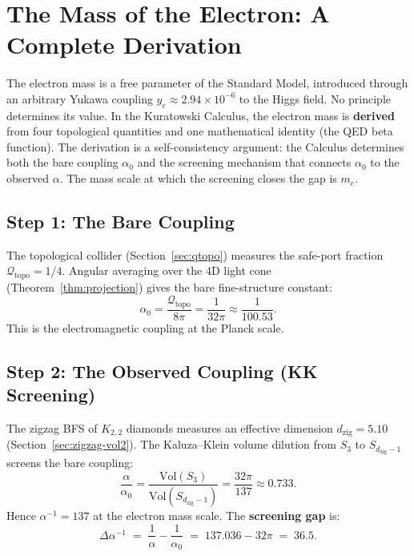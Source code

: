 \documentclass[11pt, a4paper, openany]{book}
\newcounter{thm}[chapter]
\begin{document}
\section{The Mass of the Electron: A Complete Derivation}
\label{sec:electron-mass}

The electron mass is a free parameter of the Standard Model, introduced
through an arbitrary Yukawa coupling $y_e \approx 2.94 \times 10^{-6}$
to the Higgs field.  No principle determines its value.  In the
Kuratowski Calculus, the electron mass is \textbf{derived} from four
topological quantities and one mathematical identity (the QED beta
function).  The derivation is a self-consistency argument: the Calculus
determines both the bare coupling $\alpha_0$ and the screening
mechanism that connects $\alpha_0$ to the observed $\alpha$.  The mass
scale at which the screening closes the gap is $m_e$.

\subsection{Step 1: The Bare Coupling}

The topological collider (Section~\ref{sec:qtopo}) measures the
safe-port fraction $\mathcal{Q}_{\mathrm{topo}} = 1/4$.  Angular
averaging over the 4D light cone (Theorem~\ref{thm:projection})
gives the bare fine-structure constant:
\[
  \alpha_0 = \frac{\mathcal{Q}_{\mathrm{topo}}}{8\pi}
  = \frac{1}{32\pi}
  \approx \frac{1}{100.53}.
\]
This is the electromagnetic coupling at the Planck scale.

\subsection{Step 2: The Observed Coupling (KK Screening)}

The zigzag BFS of $K_{2,2}$ diamonds measures an effective
dimension $d_{\mathrm{zig}} = 5.10$
(Section~\ref{sec:zigzag-vol2}).  The Kaluza--Klein volume
dilution from $S_3$ to $S_{d_{\mathrm{zig}}-1}$ screens the
bare coupling:
\[
  \frac{\alpha}{\alpha_0}
  = \frac{\mathrm{Vol}(S_3)}{\mathrm{Vol}(S_{d_{\mathrm{zig}}-1})}
  = \frac{32\pi}{137}
  \approx 0.733.
\]
Hence $\alpha^{-1} = 137$ at the electron mass scale.  The
\textbf{screening gap} is:
\[
  \Delta\alpha^{-1}
  \;=\; \frac{1}{\alpha} - \frac{1}{\alpha_0}
  \;=\; 137.036 - 32\pi
  \;=\; 36.5.
\]
\end{document}
